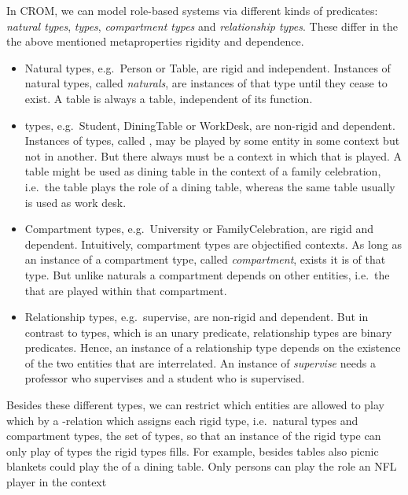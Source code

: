 In CROM, we can model role-based systems via different kinds of predicates: \emph{natural types},
\emph{\rosirole types}, \emph{compartment types} and \emph{relationship types}. These differ in the
the above mentioned metaproperties rigidity and dependence.
\begin{itemize}
\item Natural types, e.g.\ \textsf{Person} or \textsf{Table}, are rigid and independent. Instances
  of natural types, called \emph{naturals}, are instances of that type until they cease to exist. A
  table is always a table, independent of its function.
\item \Rosirole types, e.g.\ \textsf{Student}, \textsf{DiningTable} or \textsf{WorkDesk}, are
  non-rigid and dependent. Instances of \rosirole types, called \emph{\rosiroles}, may be played by
  some entity in some context but not in another. But there always must be a context in which that
  \rosirole is played.  A table might be used as dining table in the context of a family
  celebration, i.e.\ the table plays the role of a dining table, whereas the same table usually is
  used as work desk.
\item Compartment types, e.g.\ \textsf{University} or \textsf{FamilyCelebration}, are rigid and
  dependent. Intuitively, compartment types are objectified contexts. As long as an instance of a
  compartment type, called \emph{compartment}, exists it is of that type. But unlike naturals a
  compartment depends on other entities, i.e.\ the \rosiroles that are played within that
  compartment.
\item Relationship types, e.g.\ \textsf{supervise}, are non-rigid and dependent. But in contrast to
  \rosirole types, which is an unary predicate, relationship types are binary predicates. Hence, an
  instance of a relationship type depends on the existence of the two entities that are
  interrelated.  An instance of \emph{supervise} needs a professor who supervises and a student who
  is supervised.
\end{itemize}

Besides these different types, we can restrict which entities are allowed to play which \rosiroles
by a \fills-relation which assigns each rigid type, i.e.\ natural types and compartment types, the
set of \rosirole types, so that an instance of the rigid type can only play \rosiroles of \rosirole
types the rigid types fills. For example, besides tables also picnic blankets could play the \rosirole
of a dining table. Only persons can play the role an NFL player in the context


